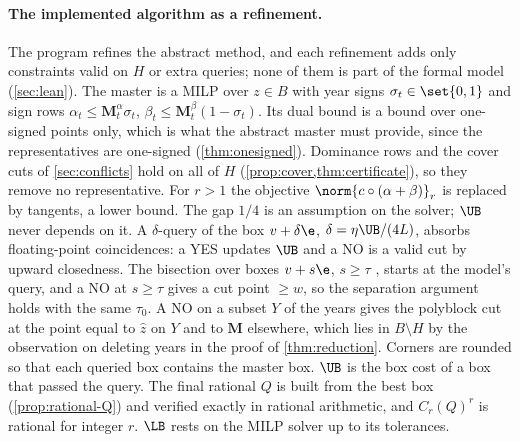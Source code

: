 \paragraph{The implemented algorithm as a refinement.}
The program refines the abstract method, and each refinement adds only constraints valid on $H$ or extra queries; none of them is part of the formal model (\cref{sec:lean}). The master is a MILP over $z\in B$ with year signs $\sigma_t\in\set{0,1}$ and sign rows $\alpha_t\le\mathbf M^\alpha_t\sigma_t$, $\beta_t\le\mathbf M^\beta_t(1-\sigma_t)$. Its dual bound is a bound over one-signed points only, which is what the abstract master must provide, since the representatives are one-signed (\cref{thm:onesigned}). Dominance rows and the cover cuts of \cref{sec:conflicts} hold on all of $H$ (\cref{prop:cover,thm:certificate}), so they remove no representative. For $r>1$ the objective $\norm{c\circ(\alpha+\beta)}_r$ is replaced by tangents, a lower bound. The gap $1/4$ is an assumption on the solver; $\UB$ never depends on it. A $\delta$-query of the box $v+\delta\e$, $\delta=\eta\UB/(4L)$, absorbs floating-point coincidences: a YES updates $\UB$ and a NO is a valid cut by upward closedness. The bisection over boxes $v+s\e$, $s\ge\tau$ \citep[p.~479]{Tuy2000}, starts at the model's query, and a NO at $s\ge\tau$ gives a cut point $\ge w$, so the separation argument holds with the same $\tau_0$. A NO on a subset $Y$ of the years gives the polyblock cut at the point equal to $\hat z$ on $Y$ and to $\mathbf M$ elsewhere, which lies in $B\setminus H$ by the observation on deleting years in the proof of \cref{thm:reduction}. Corners are rounded so that each queried box contains the master box. $\UB$ is the box cost of a box that passed the query. The final rational $Q$ is built from the best box (\cref{prop:rational-Q}) and verified exactly in rational arithmetic, and $C_r(Q)^r$ is rational for integer $r$. $\LB$ rests on the MILP solver up to its tolerances.

